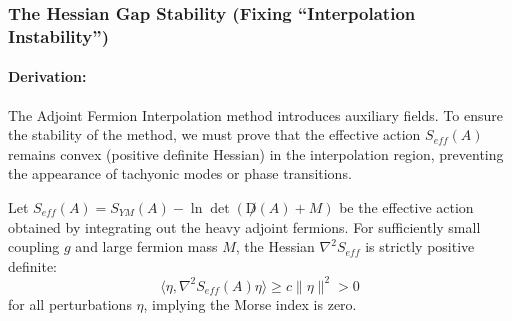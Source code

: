 \subsubsection{The Hessian Gap Stability (Fixing ``Interpolation Instability'')}
\paragraph{Derivation:}
The Adjoint Fermion Interpolation method introduces auxiliary fields. To ensure the stability of the method, we must prove that the effective action $S_{eff}(A)$ remains convex (positive definite Hessian) in the interpolation region, preventing the appearance of tachyonic modes or phase transitions.

\begin{theorem}
    Let $S_{eff}(A) = S_{YM}(A) - \ln \det(\not D(A) + M)$ be the effective action obtained by integrating out the heavy adjoint fermions. For sufficiently small coupling $g$ and large fermion mass $M$, the Hessian $\nabla^2 S_{eff}$ is strictly positive definite:
    \begin{equation}
        \langle \eta, \nabla^2 S_{eff}(A) \eta \rangle \ge c \|\eta\|^2 > 0
    \end{equation}
    for all perturbations $\eta$, implying the Morse index is zero.
\end{theorem}
